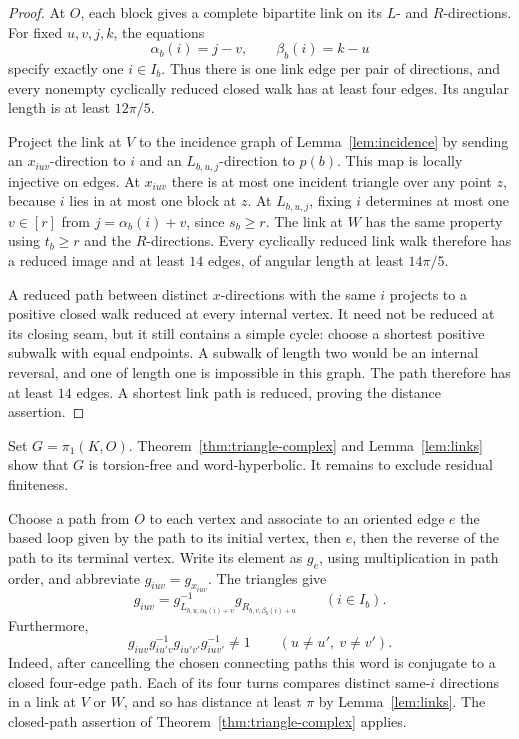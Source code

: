 \begin{proof}
At $O$, each block gives a complete bipartite link on its $L$- and $R$-directions. For fixed $u,v,j,k$, the equations
\[
 \alpha_b(i)=j-v,\qquad \beta_b(i)=k-u
\]
specify exactly one $i\in I_b$. Thus there is one link edge per pair of directions, and every nonempty cyclically reduced closed walk has at least four edges. Its angular length is at least $12\pi/5$.

Project the link at $V$ to the incidence graph of Lemma~\ref{lem:incidence} by sending an $x_{iuv}$-direction to $i$ and an $L_{b,u,j}$-direction to $p(b)$. This map is locally injective on edges. At $x_{iuv}$ there is at most one incident triangle over any point $z$, because $i$ lies in at most one block at $z$. At $L_{b,u,j}$, fixing $i$ determines at most one $v\in[r]$ from $j=\alpha_b(i)+v$, since $s_b\ge r$. The link at $W$ has the same property using $t_b\ge r$ and the $R$-directions. Every cyclically reduced link walk therefore has a reduced image and at least $14$ edges, of angular length at least $14\pi/5$.

A reduced path between distinct $x$-directions with the same $i$ projects to a positive closed walk reduced at every internal vertex. It need not be reduced at its closing seam, but it still contains a simple cycle: choose a shortest positive subwalk with equal endpoints. A subwalk of length two would be an internal reversal, and one of length one is impossible in this graph. The path therefore has at least $14$ edges. A shortest link path is reduced, proving the distance assertion.
\end{proof}

Set $G=\pi_1(K,O)$. Theorem~\ref{thm:triangle-complex} and Lemma~\ref{lem:links} show that $G$ is torsion-free and word-hyperbolic. It remains to exclude residual finiteness.

Choose a path from $O$ to each vertex and associate to an oriented edge $e$ the based loop given by the path to its initial vertex, then $e$, then the reverse of the path to its terminal vertex. Write its element as $g_e$, using multiplication in path order, and abbreviate $g_{iuv}=g_{x_{iuv}}$. The triangles give
\begin{equation}\label{eq:group-factorization}
 g_{iuv}=g_{L_{b,u,\alpha_b(i)+v}}^{-1}
               g_{R_{b,v,\beta_b(i)+u}}\qquad(i\in I_b).
\end{equation}
Furthermore,
\begin{equation}\label{eq:rectangles}
 g_{iuv}g_{iu'v}^{-1}g_{iu'v'}g_{iuv'}^{-1}\ne1
 \qquad(u\ne u',\ v\ne v').
\end{equation}
Indeed, after cancelling the chosen connecting paths this word is conjugate to a closed four-edge path. Each of its four turns compares distinct same-$i$ directions in a link at $V$ or $W$, and so has distance at least $\pi$ by Lemma~\ref{lem:links}. The closed-path assertion of Theorem~\ref{thm:triangle-complex} applies.

